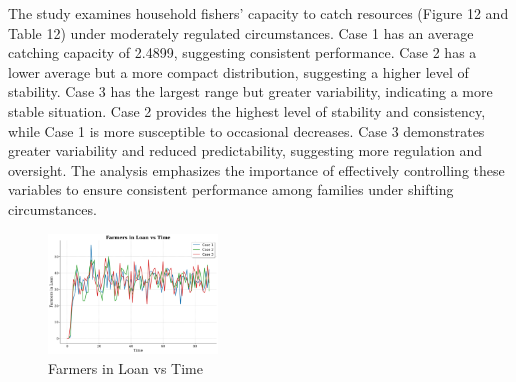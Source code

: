 \documentclass[final,5p,times,twocolumn,authoryear]{elsarticle}
\begin{document}
The study examines household fishers' capacity to catch resources (Figure 12 and Table 12) under moderately regulated circumstances. Case 1 has an average catching capacity of 2.4899, suggesting consistent performance. Case 2 has a lower average but a more compact distribution, suggesting a higher level of stability. Case 3 has the largest range but greater variability, indicating a more stable situation. Case 2 provides the highest level of stability and consistency, while Case 1 is more susceptible to occasional decreases. Case 3 demonstrates greater variability and reduced predictability, suggesting more regulation and oversight. The analysis emphasizes the importance of effectively controlling these variables to ensure consistent performance among families under shifting circumstances.\\
\begin{figure}[htbp]
    \centering
    \includegraphics[width=0.4\textwidth]{graph_all/plots_mod/farmers_in_loan_vs_time.png}
    \caption{Farmers in Loan vs Time}
    \label{fig:farmers_loan}
\end{figure}
\begin{table}[htbp]
    \centering
    \caption{Farmers in Loan - Statistical Analysis}
\end{table}
\end{document}

